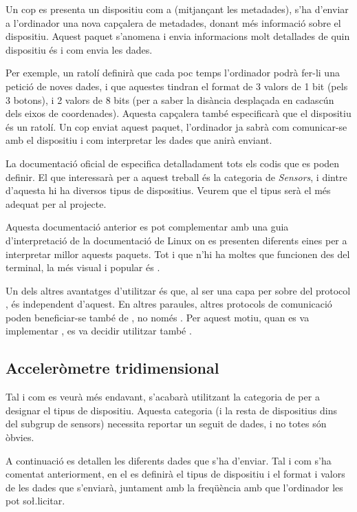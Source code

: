 Un cop es presenta un dispositiu com a 
(mitjançant les metadades), s'ha d'enviar a l'ordinador una nova capçalera de
metadades, donant més informació sobre el dispositiu. Aquest paquet s'anomena
 i envia informacions molt detallades de
quin dispositiu és i com envia les dades.

Per exemple, un ratolí definirà que cada poc temps l'ordinador podrà fer-li
una petició de noves dades, i que aquestes tindran el format de 3 valors
de 1 bit (pels 3 botons), i 2 valors de 8 bits (per a saber la disància
desplaçada en cadascún dels eixos de coordenades). Aquesta capçalera també
especificarà que el dispositiu és un ratolí. Un cop enviat aquest paquet,
l'ordinador ja sabrà com comunicar-se amb el
dispositiu i com interpretar les dades que anirà enviant.

La documentació oficial de  \cite{HidHut} especifica
detalladament tots els codis que es poden definir. El que interessarà per a
aquest treball és la categoria de \textit{Sensors}, i dintre d'aquesta hi ha
diversos tipus de dispositius. Veurem que el tipus  serà
el més adequat per al projecte.

Aquesta documentació anterior es pot complementar amb una guia d'interpretació
de la documentació de Linux \cite{LinuxHid} on es presenten diferents eines
per a interpretar millor aquests paquets. Tot i que n'hi ha moltes que
funcionen des del terminal, la més visual i popular és .

Un dels altres avantatges d'utilitzar  és que, al ser una capa per
sobre del protocol , és independent d'aquest. En altres paraules,
altres protocols de comunicació poden beneficiar-se també de , no
només . Per aquest motiu, quan es va implementar ,
es va decidir utilitzar també  \cite{BluetoothHid}.

\subsection{Acceleròmetre tridimensional}

Tal i com es veurà més endavant, s'acabarà utilitzant la categoria de
 per a designar el tipus de dispositiu. Aquesta
categoria (i la resta de dispositius dins del subgrup de sensors) necessita
reportar un seguit de dades, i no totes són òbvies.

A continuació es detallen les diferents dades que s'ha d'enviar. Tal i com s'ha
comentat anteriorment, en el  es definirà
el tipus de dispositiu i el format i valors de les dades que s'enviarà, juntament
amb la freqüència amb que l'ordinador les pot so\l.licitar.

